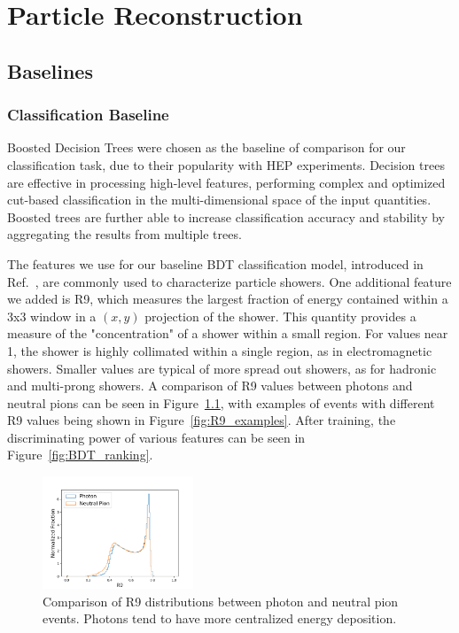 \chapter{Particle Reconstruction}
\label{sec:reco}

\section{Baselines}

\subsection*{Classification Baseline}\label{app:BDT}

Boosted Decision Trees were chosen as the baseline of comparison for our classification task, due to their popularity with HEP experiments. Decision trees are effective in processing high-level features, performing complex and optimized cut-based classification in the multi-dimensional space of the input quantities. Boosted trees are further able to increase classification accuracy and stability by aggregating the results from multiple trees.


The features we use for our baseline BDT classification model, introduced in Ref.~\cite{NIPS}, are commonly used to characterize particle showers. One additional feature we added is R9, which measures the largest fraction of energy contained within a 3x3 window in a $(x,y)$ projection of the shower. This quantity provides a measure of the "concentration" of a shower within a small region. For values near 1, the shower is highly collimated within a single region, as in electromagnetic showers. Smaller values are typical of more spread out showers, as for hadronic and multi-prong showers. A comparison of R9 values between photons and neutral pions can be seen in Figure~\ref{fig:R9}, with examples of events with different R9 values being shown in Figure~\ref{fig:R9_examples}. After training, the discriminating power of various features can be seen in Figure~\ref{fig:BDT_ranking}.

\begin{figure}[htbp]
\centering
\includegraphics[trim={0 0 0 1cm},clip,width=0.4\textwidth]{Images/Calo/R9_ratios.png}
\caption{Comparison of R9 distributions between photon and neutral pion events. Photons tend to have more centralized energy deposition.
\label{fig:R9}}
\end{figure}

